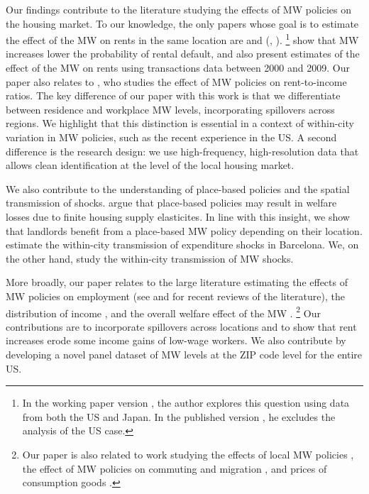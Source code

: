 Our findings contribute to the literature studying the effects of MW policies 
on the housing market.
To our knowledge, the only papers whose goal is to estimate the effect of the 
MW on rents in the same location are \textcite{Tidemann2018} and 
\citeauthor{Yamagishi2019} (\cite*{Yamagishi2019}, \cite*{Yamagishi2021}).%
\footnote{In the working paper version \parencite{Yamagishi2019}, the author 
	explores this question using data from both the US and Japan.
	In the published version \parencite{Yamagishi2021}, he excludes the analysis 
	of the US case.}
\textcite{AgarwalEtAl2021} show that MW increases lower the probability of 
rental default, and also present estimates of the effect of the MW on rents using 
transactions data between 2000 and 2009.
Our paper also relates to \textcite{Hughes2020}, who studies the effect of 
MW policies on rent-to-income ratios.
The key difference of our paper with this work is that we differentiate 
between residence and workplace MW levels, incorporating spillovers across 
regions.
We highlight that this distinction is essential in a context of within-city
variation in MW policies, such as the recent experience in the US.
A second difference is the research design: we use high-frequency,
high-resolution data that allows clean identification at the level of the 
local housing market.

We also contribute to the understanding of place-based policies and the spatial 
transmission of shocks.
\textcite{KlineMoretti2014} argue that place-based policies may result in 
welfare losses due to finite housing supply elasticites.
In line with this insight, we show that landlords benefit from a 
place-based MW policy depending on their location.
\textcite{AllenEtAl2020} estimate the within-city transmission of expenditure 
shocks in Barcelona.
We, on the other hand, study the within-city transmission of MW shocks.

More broadly, our paper relates to the large literature estimating the effects
of MW policies on employment
(see \cite{Dube2019} and \cite{NeumarkShirley2021} for recent reviews of the 
literature), 
the distribution of income \parencite[e.g.,][]{Lee1999, AutorEtAl2016, 
	Dube2019Income}, 
and the overall welfare effect of the MW \parencite{AhlfeldtEtAl2022,
	BergerHerkenhoffMongey2022}.%
\footnote{Our paper is also related to work studying 
	the effects of local MW policies 
	\parencite[e.g.,][]{DubeLindner2021, JardimEtAl2022seattle}, 
	the effect of MW policies on commuting and migration 
	\parencite[e.g.,][]{Cadena2014, Monras2019, PerezPerez2021}, 
	and prices of consumption goods 
	\parencite[e.g.,][]{Aaronson2001, AllegrettoReich2018, Leung2021}.} %
Our contributions are to incorporate spillovers across locations 
\parencite[as in the recent work by][]{JardimEtAl2022discontinuity} and to show 
that rent increases erode some income gains of low-wage workers.
We also contribute by developing a novel panel dataset of MW levels at the 
ZIP code level for the entire US.

